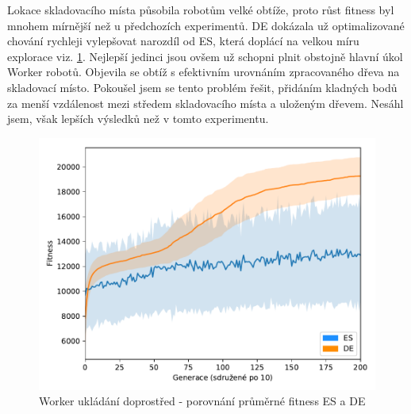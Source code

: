    	Lokace skladovacího místa působila robotům velké obtíže, proto růst fitness byl mnohem mírnější než u předchozích experimentů. DE dokázala už optimalizované chování rychleji vylepšovat narozdíl od ES, která doplácí na velkou míru explorace viz. \ref{obr04:StockESvsDE}. Nejlepší jedinci jsou ovšem už schopni plnit obstojně hlavní úkol Worker robotů. Objevila se obtíž s efektivním urovnáním zpracovaného dřeva na skladovací místo. Pokoušel jsem se tento problém řešit, přidáním kladných bodů za menší vzdálenost mezi středem skladovacího místa a uloženým dřevem. Nesáhl jsem, však lepších výsledků než v tomto experimentu. 
	\begin{figure}[t]\centering
		\includegraphics[width=\columnwidth]{../img/WoodMap/DEvsES/WorkerStockMem}
		\caption{Worker ukládání doprostřed  - porovnání průměrné fitness ES a DE}
		\label{obr04:StockESvsDE}
	\end{figure}


	\clearpage
